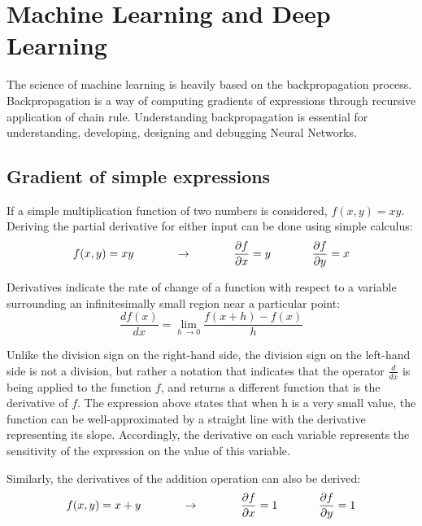 \section{Machine Learning and Deep Learning}
The science of machine learning is heavily based on the backpropagation process. Backpropagation is a way of computing gradients of expressions through recursive application of chain rule. Understanding backpropagation is essential for understanding, developing, designing and debugging Neural Networks.

\subsection{Gradient of simple expressions}

If a simple multiplication function of two numbers is considered, \(f(x,y)=xy\). Deriving the partial derivative for either input can be done using simple calculus:
\begin{equation}
f(x,y) = x y \hspace{0.5in} \rightarrow \hspace{0.5in} \frac{\partial f}{\partial x} = y \hspace{0.5in} \frac{\partial f}{\partial y} = x
\label{multiplication_deriv}
\end{equation}

Derivatives indicate the rate of change of a function with respect to a variable surrounding an infinitesimally small region near a particular point:
\begin{equation}
\frac{df(x)}{dx} = \lim_{h\ \to 0} \frac{f(x + h) - f(x)}{h}
\end{equation}

Unlike the division sign on the right-hand side, the division sign on the left-hand side is not a division, but rather a notation that indicates that the operator \(\frac{d}{dx}\) is being applied to the function \(f\), and returns a different function that is the derivative of \(f\). The expression above states that when h is a very small value, the function can be well-approximated by a straight line with the derivative representing its slope. Accordingly, the derivative on each variable represents the sensitivity of the expression on the value of this variable.

Similarly, the derivatives of the addition operation can also be derived:
\begin{equation}
f(x,y) = x + y \hspace{0.5in} \rightarrow \hspace{0.5in} \frac{\partial f}{\partial x} = 1 \hspace{0.5in} \frac{\partial f}{\partial y} = 1
\label{add_deriv}
\end{equation}

